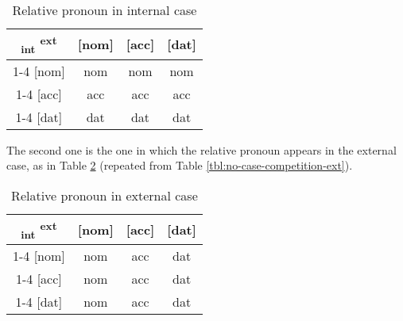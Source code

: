 \begin{table}[ht]
  \center
  \caption{Relative pronoun in internal case}
  \begin{tabular}{c|c|c|c}
    \toprule
   \textsubscript{\ac{int}} \textsuperscript{\ac{ext}}
          & [\ac{nom}]
          & [\ac{acc}]
          & [\ac{dat}]
          \\ \cmidrule{1-4}
      [\ac{nom}]
          & \ac{nom}
          & \ac{nom}
          & \ac{nom}
          \\ \cmidrule{1-4}
      [\ac{acc}]
          & \ac{acc}
          & \ac{acc}
          & \ac{acc}
          \\ \cmidrule{1-4}
      [\ac{dat}]
          & \ac{dat}
          & \ac{dat}
          & \ac{dat}
          \\
    \bottomrule
  \end{tabular}
  \label{tbl:no-case-competition-int-typology}
\end{table}

The second one is the one in which the relative pronoun appears in the external case, as in Table \ref{tbl:no-case-competition-ext-typology} (repeated from Table \ref{tbl:no-case-competition-ext}).

\begin{table}[ht]
  \center
  \caption{Relative pronoun in external case}
  \begin{tabular}{c|c|c|c}
    \toprule
   \textsubscript{\ac{int}} \textsuperscript{\ac{ext}}
          & [\ac{nom}]
          & [\ac{acc}]
          & [\ac{dat}]
          \\ \cmidrule{1-4}
      [\ac{nom}]
          & \ac{nom}
          & \ac{acc}
          & \ac{dat}
          \\ \cmidrule{1-4}
      [\ac{acc}]
          & \ac{nom}
          & \ac{acc}
          & \ac{dat}
          \\ \cmidrule{1-4}
      [\ac{dat}]
          & \ac{nom}
          & \ac{acc}
          & \ac{dat}
          \\
    \bottomrule
  \end{tabular}
  \label{tbl:no-case-competition-ext-typology}
\end{table}


